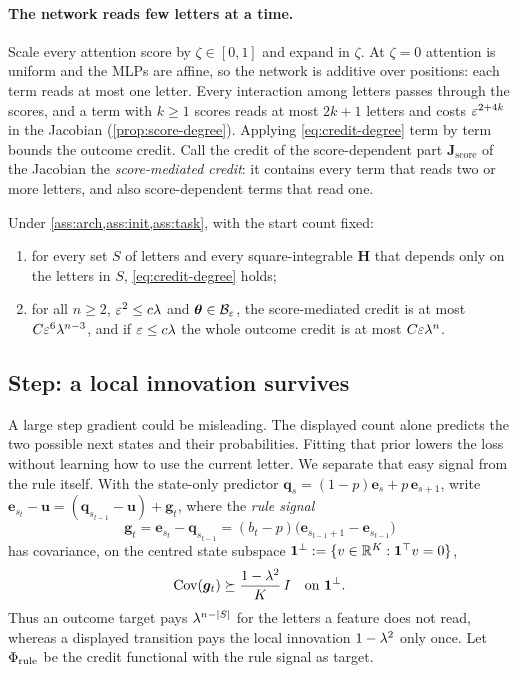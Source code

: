 \paragraph{The network reads few letters at a time.} Scale every attention score by $\zeta\in[0,1]$ and expand in $\zeta$. At $\zeta=0$ attention is uniform
and the MLPs are affine, so the network is additive over positions: each term reads at most one letter. Every interaction among letters
passes through the scores, and a term with $k\ge1$ scores reads at most $2k+1$ letters and costs $\varepsilon^{2+4k}$ in the Jacobian
(\cref{prop:score-degree}). Applying \cref{eq:credit-degree} term by term bounds the outcome credit. Call the credit of the score-dependent part
$\mathbf J_{\mathrm{score}}$ of the Jacobian the \emph{score-mediated credit}: it contains every term that reads two or more letters, and
also score-dependent terms that read one.

\begin{theorem}
\label{thm:main}
Under \cref{ass:arch,ass:init,ass:task}, with the start count fixed:
\begin{enumerate}[label=(\roman*),leftmargin=*,itemsep=0pt,topsep=2pt]
\item for every set $S$ of letters and every square-integrable $\mathbf H$ that depends only on the letters in $S$, \cref{eq:credit-degree} holds;
\item for all $n\ge2$, $\varepsilon^2\le c\lambda$ and $\bm\theta\in\mathcal B_{\varepsilon}$, the score-mediated credit is at most $C\varepsilon^6\lambda^{n-3}$, and if
$\varepsilon\le c\lambda$ the whole outcome credit is at most $C\varepsilon\lambda^n$.
\end{enumerate}
\end{theorem}

\subsection{Step: a local innovation survives}
A large step gradient could be misleading. The displayed count alone predicts the two possible next states and their probabilities.
Fitting that prior lowers the loss without learning how to use the current letter. We separate that easy signal from the rule itself. With the
state-only predictor $\bm q_s=(1-p)\bm e_s+p\,\bm e_{s+1}$, write $\bm e_{s_t}-\bm u=(\bm q_{s_{t-1}}-\bm u)+\bm g_t$, where the
\emph{rule signal}
\[
 \bm g_t=\bm e_{s_t}-\bm q_{s_{t-1}}=(b_t-p)\bigl(\bm e_{s_{t-1}+1}-\bm e_{s_{t-1}}\bigr)
\]
has covariance, on the centred state subspace $\mathbf 1^\perp:=\{v\in\mathbb R^K:\mathbf 1^\top v=0\}$,
\begin{equation}
 \operatorname{Cov}(\bm g_t)\succeq\frac{1-\lambda^2}{K}\,I
 \quad\text{on }\mathbf 1^\perp.
 \label{eq:local-variation}
\end{equation}
Thus an outcome target pays $\lambda^{n-|S|}$ for the letters a feature does not read, whereas a displayed transition pays the
local innovation $1-\lambda^2$ only once. Let $\Phi_{\mathrm{rule}}$ be the credit
functional with the rule signal as target.

